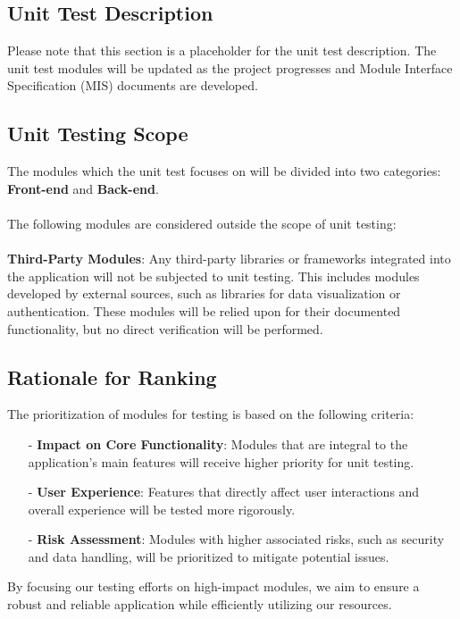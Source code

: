 \documentclass[12pt, titlepage]{article}
\begin{document}
\begin{enumerate}
\begin{enumerate}
\begin{enumerate}
\section{Unit Test Description}
Please note that this section is a placeholder for the unit test description. The unit test modules will be updated as the project progresses and Module Interface Specification (MIS) documents are developed.
\subsection{Unit Testing Scope}
The modules which the unit test focuses on will be divided into two categories: \textbf{Front-end} and \textbf{Back-end}.\\\\
The following modules are considered outside the scope of unit testing:\\\\
\textbf{Third-Party Modules}: 
Any third-party libraries or frameworks integrated into the application will not be subjected to unit testing. This includes modules developed by external sources, such as libraries for data visualization or authentication. These modules will be relied upon for their documented functionality, but no direct verification will be performed.


\subsection{Rationale for Ranking}
The prioritization of modules for testing is based on the following criteria:
\begin{itemize}
    \item[-] \textbf{Impact on Core Functionality}: Modules that are integral to the application’s main features will receive higher priority for unit testing.
    \item[-] \textbf{User Experience}: Features that directly affect user interactions and overall experience will be tested more rigorously.
    \item[-] \textbf{Risk Assessment}: Modules with higher associated risks, such as security and data handling, will be prioritized to mitigate potential issues.
\end{itemize}

\noindent By focusing our testing efforts on high-impact modules, we aim to ensure a robust and reliable application while efficiently utilizing our resources.

\newpage



\end{enumerate}
\end{enumerate}
\end{enumerate}
\end{document}
